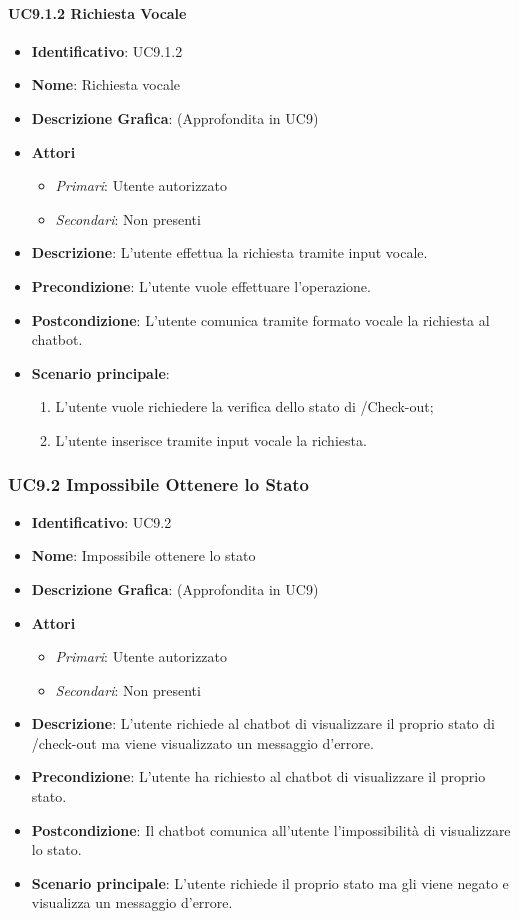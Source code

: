 \paragraph{UC9.1.2 Richiesta Vocale}
\begin{itemize}
	\item \textbf{Identificativo}: UC9.1.2
	\item \textbf{Nome}: Richiesta vocale
	\item \textbf{Descrizione Grafica}: (Approfondita in UC9)
	\item \textbf{Attori}
	\begin{itemize}
		\item \textit{Primari}: Utente autorizzato
		\item \textit{Secondari}: Non presenti
	\end{itemize}
	\item \textbf{Descrizione}: L'utente effettua la richiesta tramite input vocale.
	\item \textbf{Precondizione}: L'utente vuole effettuare l'operazione.
	\item \textbf{Postcondizione}: L'utente comunica tramite formato vocale la richiesta al chatbot.
	\item \textbf{Scenario principale}: 
	\begin{enumerate}
		\item L'utente vuole richiedere la verifica dello stato di /Check-out;
		\item L'utente inserisce tramite input vocale la richiesta.
	\end{enumerate}
\end{itemize}

\subsubsection{UC9.2 Impossibile Ottenere lo Stato}
\begin{itemize}
	\item \textbf{Identificativo}: UC9.2
	\item \textbf{Nome}: Impossibile ottenere lo stato
	\item \textbf{Descrizione Grafica}: (Approfondita in UC9)
	\item \textbf{Attori}
	\begin{itemize}
		\item \textit{Primari}: Utente autorizzato
		\item \textit{Secondari}: Non presenti
	\end{itemize}
	\item \textbf{Descrizione}: L'utente richiede al chatbot di visualizzare il proprio stato di /check-out ma viene visualizzato un messaggio d'errore.
	\item \textbf{Precondizione}: L'utente ha richiesto al chatbot di visualizzare il proprio stato.
	\item \textbf{Postcondizione}: Il chatbot comunica all'utente l'impossibilità di visualizzare lo stato.
	\item \textbf{Scenario principale}: L'utente richiede il proprio stato ma gli viene negato e visualizza un messaggio d'errore.
\end{itemize}
\newpage